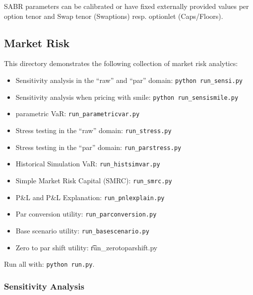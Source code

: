SABR parameters can be calibrated or have fixed externally provided values
per option tenor and Swap tenor (Swaptions) resp. optionlet (Caps/Floors).

\subsection{Market Risk}\label{example:marketrisk}

This directory demonstrates the following collection of market risk analytics:
\begin{itemize}
\item Sensitivity analysis in the ``raw'' and ``par'' domain: {\tt python run\_sensi.py}
\item Sensitivity analysis when pricing with smile: {\tt python run\_sensismile.py}
\item parametric VaR: {\tt run\_parametricvar.py}
\item Stress testing in the ``raw'' domain: {\tt run\_stress.py}
\item Stress testing in the ``par'' domain: {\tt run\_parstress.py}
\item Historical Simulation VaR: {\tt run\_histsimvar.py}
\item Simple Market Risk Capital (SMRC): {\tt run\_smrc.py}
\item P\&L and P\&L Explanation: {\tt run\_pnlexplain.py}
\item Par conversion utility: {\tt run\_parconversion.py}
\item Base scenario utility: {\tt run\_basescenario.py}
\item Zero to par shift utility: {\t run\_zerotoparshift.py}
\end{itemize}

Run all with: {\tt python run.py}.

\subsubsection{Sensitivity Analysis}
\label{example:marketrisk_sensi}

